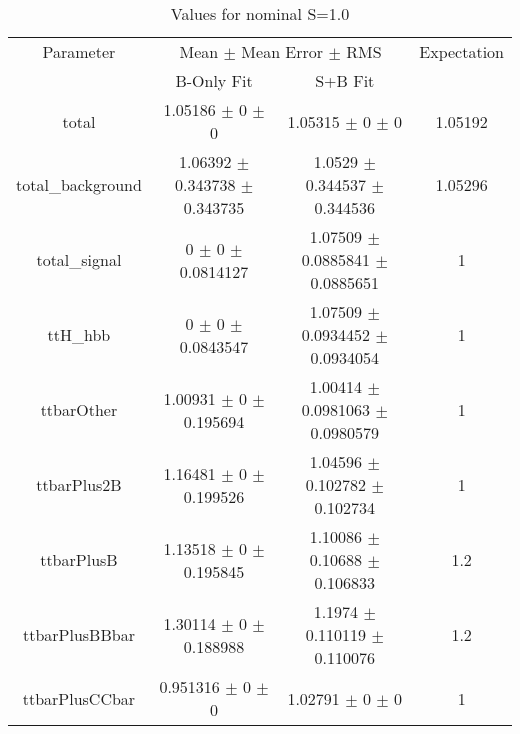 \begin{table}
\centering
\caption{Values for nominal S=1.0}
\begin{tabular}{cccc}
\toprule
Parameter & \multicolumn{2}{c}{Mean $\pm$ Mean Error $\pm$ RMS} & Expectation\\
 & B-Only Fit & S+B Fit & \\
\midrule
total & \num{1.05186} $\pm$ \num{0} $\pm$ \num{0} & \num{1.05315} $\pm$ \num{0} $\pm$ \num{0} & \num{1.05192}\\
total\_background & \num{1.06392} $\pm$ \num{0.343738} $\pm$ \num{0.343735} & \num{1.0529} $\pm$ \num{0.344537} $\pm$ \num{0.344536} & \num{1.05296}\\
total\_signal & \num{0} $\pm$ \num{0} $\pm$ \num{0.0814127} & \num{1.07509} $\pm$ \num{0.0885841} $\pm$ \num{0.0885651} & \num{1}\\
ttH\_hbb & \num{0} $\pm$ \num{0} $\pm$ \num{0.0843547} & \num{1.07509} $\pm$ \num{0.0934452} $\pm$ \num{0.0934054} & \num{1}\\
ttbarOther & \num{1.00931} $\pm$ \num{0} $\pm$ \num{0.195694} & \num{1.00414} $\pm$ \num{0.0981063} $\pm$ \num{0.0980579} & \num{1}\\
ttbarPlus2B & \num{1.16481} $\pm$ \num{0} $\pm$ \num{0.199526} & \num{1.04596} $\pm$ \num{0.102782} $\pm$ \num{0.102734} & \num{1}\\
ttbarPlusB & \num{1.13518} $\pm$ \num{0} $\pm$ \num{0.195845} & \num{1.10086} $\pm$ \num{0.10688} $\pm$ \num{0.106833} & \num{1.2}\\
ttbarPlusBBbar & \num{1.30114} $\pm$ \num{0} $\pm$ \num{0.188988} & \num{1.1974} $\pm$ \num{0.110119} $\pm$ \num{0.110076} & \num{1.2}\\
ttbarPlusCCbar & \num{0.951316} $\pm$ \num{0} $\pm$ \num{0} & \num{1.02791} $\pm$ \num{0} $\pm$ \num{0} & \num{1}\\
\bottomrule
\end{tabular}
\end{table}